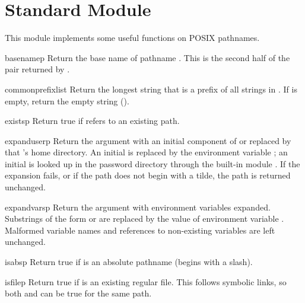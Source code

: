 \section{Standard Module }

This module implements some useful functions on POSIX pathnames.

\renewcommand{\indexsubitem}{(in module posixpath)}
\begin{funcdesc}{basename}{p}
Return the base name of pathname
.
This is the second half of the pair returned by
.
\end{funcdesc}

\begin{funcdesc}{commonprefix}{list}
Return the longest string that is a prefix of all strings in
.
If
is empty, return the empty string ().
\end{funcdesc}

\begin{funcdesc}{exists}{p}
Return true if
refers to an existing path.
\end{funcdesc}

\begin{funcdesc}{expanduser}{p}
Return the argument with an initial component of \samp{\~} or
 replaced by that 's home directory.  An
initial \samp{\~{}} is replaced by the environment variable ;
an initial  is looked up in the password directory through
the built-in module .  If the expansion fails, or if the
path does not begin with a tilde, the path is returned unchanged.
\end{funcdesc}

\begin{funcdesc}{expandvars}{p}
Return the argument with environment variables expanded.  Substrings
of the form  or  are
replaced by the value of environment variable .  Malformed
variable names and references to non-existing variables are left
unchanged.
\end{funcdesc}

\begin{funcdesc}{isabs}{p}
Return true if  is an absolute pathname (begins with a slash).
\end{funcdesc}

\begin{funcdesc}{isfile}{p}
Return true if  is an existing regular file.  This follows
symbolic links, so both  and  can be true for the same
path.
\end{funcdesc}

